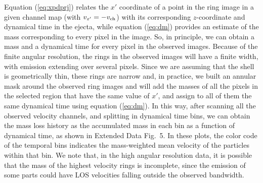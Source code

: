 \documentclass[12pt]{mythesis}
\begin{document}
Equation (\ref{eq:xpdprj}) relates the $x'$ coordinate of a point in the ring image in a given channel map (with $v_{z'}=-v_{\rm ch}$) with its corresponding $z$-coordinate and dynamical time in the ejecta, while equation (\ref{eq:dm}) provides an estimate of the mass corresponding to every pixel in the image. So, in principle, we can obtain a mass and a dynamical time for every pixel in the observed images. Because of the finite angular resolution, the rings in the observed images will have a finite width, with emission extending over several pixels. Since we are assuming that the shell is geometrically thin, these rings are narrow and, in practice, we built an annular mask around the observed ring images and will add the masses of all the pixels in the selected region that have the same value of $x'$, and assign to all of them the same dynamical time using equation (\ref{eq:dm}). In this way, after scanning all the observed velocity channels, and splitting in dynamical time bins, we can obtain the mass loss history as the accumulated mass in each bin as a function of dynamical time, as shown in Extended Data Fig.\ 5. In these plots, the color code of the temporal bins indicates the mass-weighted mean velocity of the particles within that bin. We note that, in the high angular resolution data, it is possible that the mass of the highest velocity rings is incomplete, since the emission of some parts could have LOS velocities falling outside the observed bandwidth.

\end{document}

